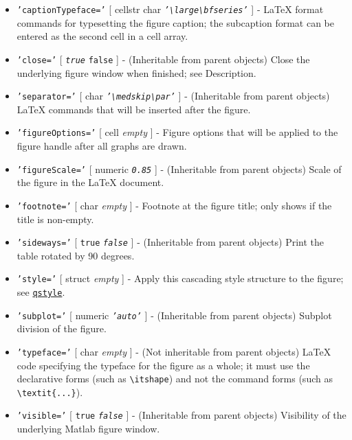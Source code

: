 \begin{itemize}
\item
  \texttt{'captionTypeface='} {[} cellstr \textbar{} char \textbar{}
  \emph{\texttt{'\textbackslash{}large\textbackslash{}bfseries'}} {]} -
  LaTeX format commands for typesetting the figure caption; the
  subcaption format can be entered as the second cell in a cell array.
\item
  \texttt{'close='} {[} \emph{\texttt{true}} \textbar{} \texttt{false}
  {]} - (Inheritable from parent objects) Close the underlying figure
  window when finished; see Description.
\item
  \texttt{'separator='} {[} char \textbar{}
  \emph{\texttt{'\textbackslash{}medskip\textbackslash{}par'}} {]} -
  (Inheritable from parent objects) LaTeX commands that will be inserted
  after the figure.
\item
  \texttt{'figureOptions='} {[} cell \textbar{} \emph{empty} {]} -
  Figure options that will be applied to the figure handle after all
  graphs are drawn.
\item
  \texttt{'figureScale='} {[} numeric \textbar{} \emph{\texttt{0.85}}
  {]} - (Inheritable from parent objects) Scale of the figure in the
  LaTeX document.
\item
  \texttt{'footnote='} {[} char \textbar{} \emph{empty} {]} - Footnote
  at the figure title; only shows if the title is non-empty.
\item
  \texttt{'sideways='} {[} \texttt{true} \textbar{}
  \emph{\texttt{false}} {]} - (Inheritable from parent objects) Print
  the table rotated by 90 degrees.
\item
  \texttt{'style='} {[} struct \textbar{} \emph{empty} {]} - Apply this
  cascading style structure to the figure; see
  \href{qreport/qstyle}{\texttt{qstyle}}.
\item
  \texttt{'subplot='} {[} numeric \textbar{} \emph{\texttt{'auto'}} {]}
  - (Inheritable from parent objects) Subplot division of the figure.
\item
  \texttt{'typeface='} {[} char \textbar{} \emph{empty} {]} - (Not
  inheritable from parent objects) LaTeX code specifying the typeface
  for the figure as a whole; it must use the declarative forms (such as
  \texttt{\textbackslash{}itshape}) and not the command forms (such as
  \texttt{\textbackslash{}textit\{...\}}).
\item
  \texttt{'visible='} {[} \texttt{true} \textbar{} \emph{\texttt{false}}
  {]} - (Inheritable from parent objects) Visibility of the underlying
  Matlab figure window.
\end{itemize}

